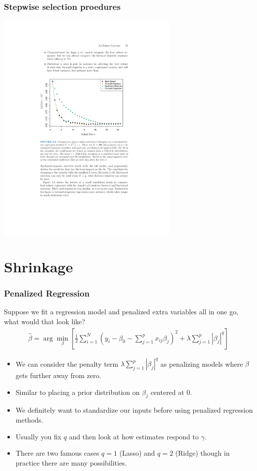 \begin{frame}
\frametitle{Stepwise selection proedures}
\begin{center}
\includegraphics[width=3.5in]{./resources/subsetstepwise}
\end{center}
\end{frame}

\section{Shrinkage}

\begin{frame}
\frametitle{Penalized Regression}
Suppose we fit a regression model and penalized extra variables all in one go, what would that look like?
\begin{eqnarray*}
\hat{\beta} = \arg \min_{\beta} \left[\frac{1}{2} \sum_{i=1}^N (y_i - \beta_0 - \sum_{j=1}^p x_{ij} \beta_j)^2 + \lambda \sum_{j=1}^p | \beta_j|^{q} \right]
\end{eqnarray*}
\begin{itemize}
\item We can consider the penalty term $\lambda \sum_{j=1}^p | \beta_j|^{q}$ as penalizing models where $\beta$ gets further away from zero.
\item Similar to placing a \alert{prior distribution} on $\beta_j$ centered at 0.
\item We definitely want to \alert{standardize} our inputs before using penalized regression methods.
\item Usually you fix $q$ and then look at how estimates respond to $\gamma$.
\item There are two famous cases $q=1$ (Lasso) and $q=2$ (Ridge) though in practice there are many possibilities.
\end{itemize}
\end{frame}



